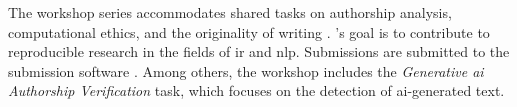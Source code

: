 The \pan{} workshop series accommodates shared tasks %
on authorship analysis, computational ethics, and the originality of writing \cite{zangerle_overview_nodate}.
\pan{}'s goal is to contribute to reproducible research in the fields of \ac{ir} and \ac{nlp}.
Submissions are submitted to the submission software \tira{}.
Among others, the workshop includes the \textit{Generative \ac{ai} Authorship Verification} task, which focuses on the detection of \ac{ai}-generated text.
